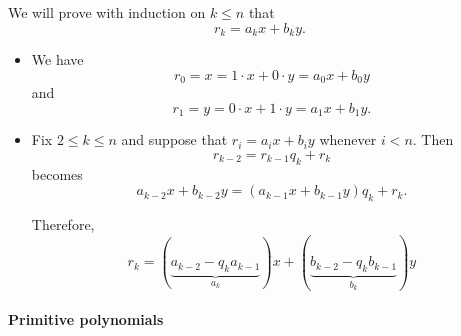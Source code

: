 \begin{defproof}
  We will prove with induction on \( k \leq n \) that
  \begin{equation*}
    r_k = a_k x + b_k y.
  \end{equation*}

  \begin{itemize}
    \item We have
    \begin{equation*}
      r_0 = x = 1 \cdot x + 0 \cdot y = a_0 x + b_0 y
    \end{equation*}
    and
    \begin{equation*}
      r_1 = y = 0 \cdot x + 1 \cdot y = a_1 x + b_1 y.
    \end{equation*}

    \item Fix \( 2 \leq k \leq n \) and suppose that \( r_i = a_i x + b_i y \) whenever \( i < n \). Then
    \begin{equation*}
      r_{k-2} = r_{k-1} q_k + r_k
    \end{equation*}
    becomes
    \begin{equation*}
      a_{k-2} x + b_{k-2} y = (a_{k-1} x + b_{k-1} y) q_k + r_k.
    \end{equation*}

    Therefore,
    \begin{equation*}
      r_k = (\underbrace{a_{k-2} - q_k a_{k-1}}_{a_k}) x + (\underbrace{b_{k-2} - q_k b_{k-1}}_{b_k}) y
    \end{equation*}
  \end{itemize}
\end{defproof}

\paragraph{Primitive polynomials}

